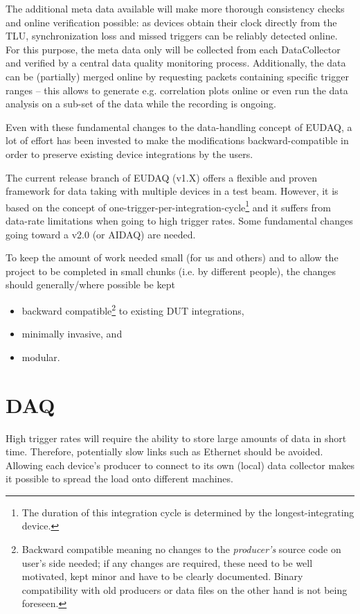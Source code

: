 \documentclass[paper=a4, fontsize=11pt, titlepage]{scrartcl}	%
\numberwithin{equation}{section}		%
\numberwithin{figure}{section}			%
\numberwithin{table}{section}           	%
\begin{document}
The additional meta data available will make more thorough consistency
checks and online verification possible: as devices obtain their clock
directly from the TLU, synchronization loss and missed triggers can be
reliably detected online. For this purpose, the meta data only will be
collected from each DataCollector and verified by a central data quality monitoring
process. Additionally, the data can be (partially) merged online
by requesting packets containing specific trigger ranges -- this
allows to generate e.g. correlation plots online or even run the data
analysis on a sub-set of the data while the recording is ongoing.

Even with these fundamental changes to the data-handling concept of EUDAQ, a lot of
effort has been invested to make the modifications backward-compatible
in order to preserve existing device integrations by the users.


The current release branch of EUDAQ (v1.X) offers a flexible and proven
framework for data taking with multiple devices in a test
beam. However, it is based on the concept of
one-trigger-per-integration-cycle\footnote{The duration of this
  integration cycle is determined by the longest-integrating device.}
and it suffers from data-rate limitations when going to high trigger
rates. Some fundamental changes going toward a v2.0 (or AIDAQ) are
needed.

To keep the amount of work needed small (for us and others) and to allow the project to
be completed in small chunks (i.e. by different people), the changes
should generally/where possible be kept
\begin{itemize}
\item backward compatible\footnote{Backward compatible meaning no
    changes to the \emph{producer's} source code on user's side needed; if any
    changes are required, these need to be well motivated, kept minor and
    have to be clearly documented. Binary compatibility with old producers or
    data files on the other hand is not being foreseen.} to existing DUT integrations,
\item minimally invasive, and
\item modular.
\end{itemize}

\section{DAQ}
\label{sec:daq}
High trigger rates will require the ability to store large amounts of
data in short time. Therefore, potentially slow links such as Ethernet
should be avoided. Allowing each device's producer to connect to its
own (local) data collector makes it possible to spread the load onto
different machines.
\end{document}
